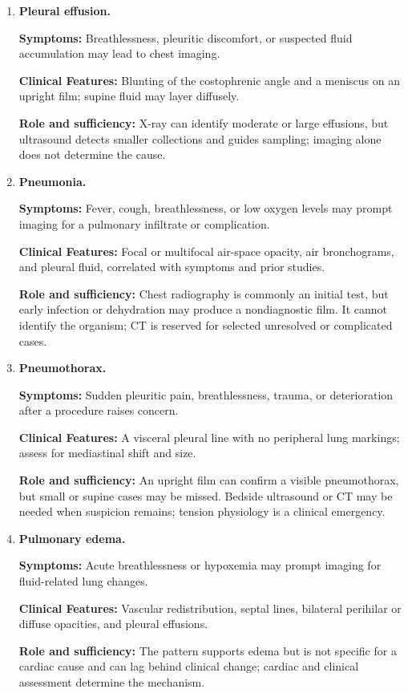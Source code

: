 \begin{enumerate}[leftmargin=*,itemsep=0.45em,topsep=0.4em]
\item \textbf{Pleural effusion.}\par\noindent\textbf{Symptoms:} Breathlessness, pleuritic discomfort, or suspected fluid accumulation may lead to chest imaging.\par\noindent\textbf{Clinical Features:} Blunting of the costophrenic angle and a meniscus on an upright film; supine fluid may layer diffusely.\par\noindent\textbf{Role and sufficiency:} X-ray can identify moderate or large effusions, but ultrasound detects smaller collections and guides sampling; imaging alone does not determine the cause.
\item \textbf{Pneumonia.}\par\noindent\textbf{Symptoms:} Fever, cough, breathlessness, or low oxygen levels may prompt imaging for a pulmonary infiltrate or complication.\par\noindent\textbf{Clinical Features:} Focal or multifocal air-space opacity, air bronchograms, and pleural fluid, correlated with symptoms and prior studies.\par\noindent\textbf{Role and sufficiency:} Chest radiography is commonly an initial test, but early infection or dehydration may produce a nondiagnostic film. It cannot identify the organism; CT is reserved for selected unresolved or complicated cases.
\item \textbf{Pneumothorax.}\par\noindent\textbf{Symptoms:} Sudden pleuritic pain, breathlessness, trauma, or deterioration after a procedure raises concern.\par\noindent\textbf{Clinical Features:} A visceral pleural line with no peripheral lung markings; assess for mediastinal shift and size.\par\noindent\textbf{Role and sufficiency:} An upright film can confirm a visible pneumothorax, but small or supine cases may be missed. Bedside ultrasound or CT may be needed when suspicion remains; tension physiology is a clinical emergency.
\item \textbf{Pulmonary edema.}\par\noindent\textbf{Symptoms:} Acute breathlessness or hypoxemia may prompt imaging for fluid-related lung changes.\par\noindent\textbf{Clinical Features:} Vascular redistribution, septal lines, bilateral perihilar or diffuse opacities, and pleural effusions.\par\noindent\textbf{Role and sufficiency:} The pattern supports edema but is not specific for a cardiac cause and can lag behind clinical change; cardiac and clinical assessment determine the mechanism.

\end{enumerate}
